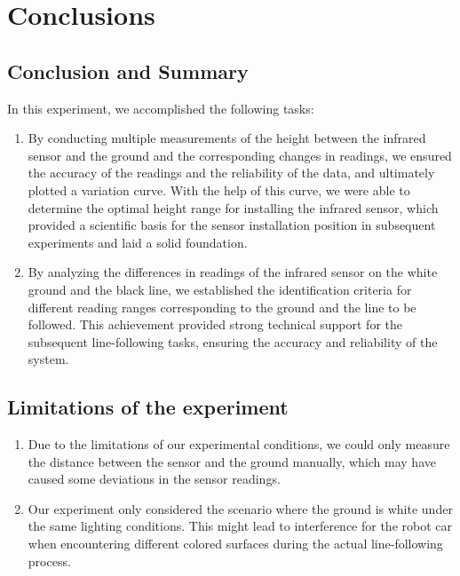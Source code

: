 \section{Conclusions}\label{sec:conclusions}
\subsection*{Conclusion and Summary}
In this experiment, we accomplished the following tasks:
\begin{enumerate}
	\item By conducting multiple measurements of the height between the infrared sensor and the ground and the corresponding changes in readings, we ensured the accuracy of the readings and the reliability of the data, and ultimately plotted a variation curve. 
	With the help of this curve, we were able to determine the optimal height range for installing the infrared sensor, which provided a scientific basis for the sensor installation position in subsequent experiments and laid a solid foundation.
	\item By analyzing the differences in readings of the infrared sensor on the white ground and the black line, we established the identification criteria for different reading ranges corresponding to the ground and the line to be followed. 
	This achievement provided strong technical support for the subsequent line-following tasks, ensuring the accuracy and reliability of the system.
\end{enumerate}

\subsection*{Limitations of the experiment}
\begin{enumerate}
	\item Due to the limitations of our experimental conditions, we could only measure the distance between the sensor and the ground manually, which may have caused some deviations in the sensor readings.
	\item Our experiment only considered the scenario where the ground is white under the same lighting conditions. 
	This might lead to interference for the robot car when encountering different colored surfaces during the actual line-following process.
\end{enumerate}

